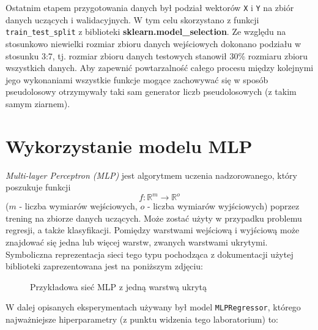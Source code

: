 \documentclass{article}
\newcommand{\code}[1]{\colorbox{light-gray}{\texttt{#1}}}
\begin{document}
\vspace{0.2cm}

\noindent Ostatnim etapem przygotowania danych był podział wektorów \code{X} i \code{Y} na zbiór danych uczących i walidacyjnych. W tym celu skorzystano z funkcji \code{train\_test\_split} z biblioteki \textbf{sklearn.model\_selection}. Ze względu na stosunkowo niewielki rozmiar zbioru danych wejściowych dokonano podziału w stosunku 3:7, tj. rozmiar zbioru danych testowych stanowił 30\% rozmiaru zbioru wszystkich danych. Aby zapewnić powtarzalność całego procesu między kolejnymi jego wykonaniami wszystkie funkcje mogące zachowywać się w sposób pseudolosowy otrzymywały taki sam generator liczb pseudolosowych (z takim samym ziarnem).

\section{Wykorzystanie modelu MLP}
    \textit{Multi-layer Perceptron (MLP)} jest algorytmem uczenia nadzorowanego, który poszukuje funkcji
    $$f: \mathbb{R}^{m} \rightarrow \mathbb{R}^{o}$$
    ($m$ - liczba wymiarów wejściowych, $o$ - liczba wymiarów wyjściowych) poprzez trening na zbiorze danych uczących. Może zostać użyty w przypadku problemu regresji, a także klasyfikacji. Pomiędzy warstwami wejściową i wyjściową może znajdować się jedna lub więcej warstw, zwanych warstwami ukrytymi. Symboliczna reprezentacja sieci tego typu pochodząca z dokumentacji użytej biblioteki \cite{scikit} zaprezentowana jest na poniższym zdjęciu:
    \begin{figure}[!htbp]%
        \centering
        \caption{Przykładowa sieć MLP z jedną warstwą ukrytą}%
        \label{fig:mlp_example}
    \end{figure}

    \noindent W dalej opisanych eksperymentach używany był model \code{MLPRegressor}, którego najważniejsze hiperparametry (z punktu widzenia tego laboratorium) to:
\end{document}
